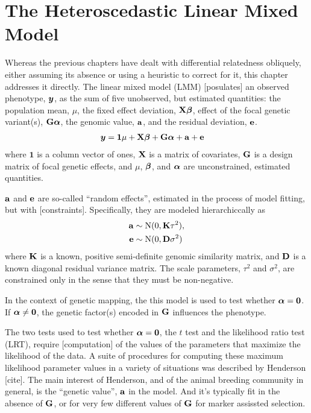 \chapter{The Heteroscedastic Linear Mixed Model}

Whereas the previous chapters have dealt with differential relatedness obliquely, either assuming its absence or using a heuristic to correct for it, this chapter addresses it directly.
The linear mixed model (LMM) [posulates] an observed phenotype, $\bm{y}$, as the sum of five unobserved, but estimated quantities: the population mean, $\mu$, the fixed effect deviation, $\mathbf{X}\boldsymbol{\beta}$, effect of the focal genetic variant(s), $\mathbf{G}\boldsymbol{\alpha}$, the genomic value, $\mathbf{a}$, and the residual deviation, $\mathbf{e}$.
\begin{align}
	\bm{y}	&= \mathbf{1}\mu + \mathbf{X}\boldsymbol{\beta} + \mathbf{G}\boldsymbol{\alpha} + \mathbf{a} + \mathbf{e}  \label{eq:lmm}
\end{align}
where $\mathbf{1}$ is a column vector of ones, $\mathbf{X}$ is a matrix of covariates, $\mathbf{G}$ is a design matrix of focal genetic effects, and $\mu$, $\boldsymbol{\beta}$, and $\boldsymbol{\alpha}$ are unconstrained, estimated quantities.

$\mathbf{a}$ and $\mathbf{e}$ are so-called ``random effects'', estimated in the process of model fitting, but with [constraints].
Specifically, they are modeled hierarchiccally as
\begin{align}
    \mathbf{a} &\sim \mathrm{N}(0, \mathbf{K} \tau^2) ,   \label{eq:a}\\
    \mathbf{e} &\sim \mathrm{N}(0, \mathbf{D} \sigma^2)   \label{eq:e}
\end{align}
where $\mathbf{K}$ is a known, positive semi-definite genomic similarity matrix, and $\mathbf{D}$ is a known diagonal residual variance matrix.
The scale parameters, $\tau^2$ and $\sigma^2$, are constrained only in the sense that they must be non-negative.

In the context of genetic mapping, the this model is used to test whether $\boldsymbol{\alpha} = \bm{0}$.
If $\boldsymbol{\alpha} \neq \bm{0}$, the genetic factor(s) encoded in $\mathbf{G}$ influences the phenotype.

The two tests used to test whether $\boldsymbol{\alpha} = \bm{0}$, the $t$ test and the likelihood ratio test (LRT), require [computation] of the values of the parameters that maximize the likelihood of the data.
A suite of procedures for computing these maximum likelihood parameter values in a variety of situations was described by Henderson [cite].
The main interest of Henderson, and of the animal breeding community in general, is the ``genetic value'', $\mathbf{a}$ in the model.
And it's typically fit in the absence of $\mathbf{G}$, or for very few different values of $\mathbf{G}$ for marker assissted selection.




